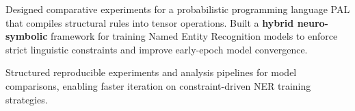     \vspace{0.10 cm}
    \begin{onecolentry}
        \begin{highlights}
    
    \item Designed comparative experiments for a probabilistic programming language PAL that compiles structural rules into tensor operations. Built a \textbf{hybrid neuro-symbolic} framework for training Named Entity Recognition models to enforce strict linguistic constraints and improve early-epoch model convergence.

    \item Structured reproducible experiments and analysis pipelines for model comparisons, enabling faster iteration on constraint-driven NER training strategies.

        
        \end{highlights}
    \end{onecolentry}
